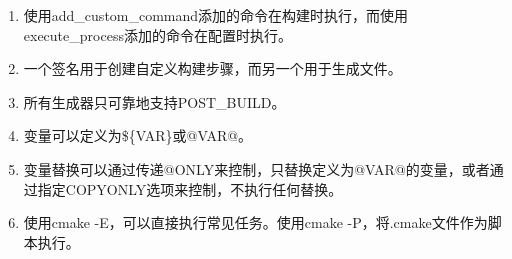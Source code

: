 

\begin{enumerate}
\item 
使用add\_custom\_command添加的命令在构建时执行，而使用execute\_process添加的命令在配置时执行。

\item
一个签名用于创建自定义构建步骤，而另一个用于生成文件。

\item 
所有生成器只可靠地支持POST\_BUILD。

\item 
变量可以定义为\$\{VAR\}或@VAR@。

\item 
变量替换可以通过传递@ONLY来控制，只替换定义为@VAR@的变量，或者通过指定COPYONLY选项来控制，不执行任何替换。

\item 
使用cmake -E，可以直接执行常见任务。使用cmake -P，将.cmake文件作为脚本执行。
\end{enumerate}